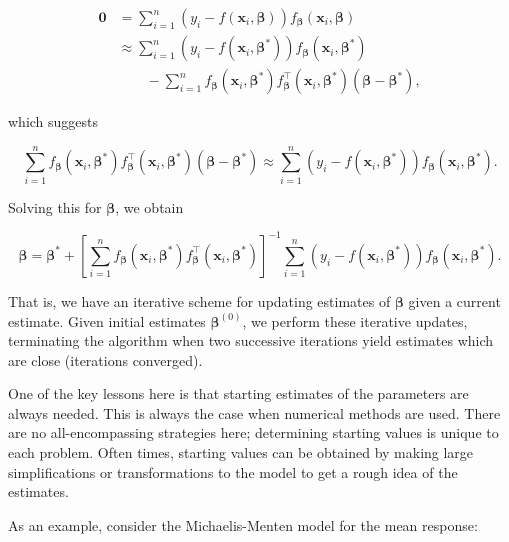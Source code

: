 \documentclass[
  letterpaper,
  DIV=11,
  numbers=noendperiod]{scrreprt}
\theoremstyle{definition}
\theoremstyle{definition}
\theoremstyle{remark}
\begin{document}
\[
\begin{aligned}
  \mathbf{0} &= \sum_{i=1}^{n} \left(y_i - f\left(\mathbf{x}_i, \boldsymbol{\beta}\right)\right) f_{\boldsymbol{\beta}}\left(\mathbf{x}_i, \boldsymbol{\beta}\right) \\
    &\approx \sum\limits_{i=1}^{n} \left(y_i - f(\mathbf{x}_i,\boldsymbol{\beta}^*)\right)f_{\boldsymbol{\beta}}(\mathbf{x}_i,\boldsymbol{\beta}^*) \\
    &\qquad - \sum\limits_{i=1}^{n} f_{\boldsymbol{\beta}}\left(\mathbf{x}_i,\boldsymbol{\beta}^*\right)f_{\boldsymbol{\beta}}^\top\left(\mathbf{x}_i,\boldsymbol{\beta}^*\right)\left(\boldsymbol{\beta}-\boldsymbol{\beta}^*\right),
\end{aligned}
\]

which suggests

\[\sum_{i=1}^{n} f_{\boldsymbol{\beta}}\left(\mathbf{x}_i,\boldsymbol{\beta}^*\right)f_{\boldsymbol{\beta}}^\top\left(\mathbf{x}_i,\boldsymbol{\beta}^*\right)\left(\boldsymbol{\beta}-\boldsymbol{\beta}^*\right) \approx \sum\limits_{i=1}^{n} \left(y_i - f(\mathbf{x}_i,\boldsymbol{\beta}^*)\right)f_{\boldsymbol{\beta}}(\mathbf{x}_i,\boldsymbol{\beta}^*).\]

Solving this for \(\boldsymbol{\beta}\), we obtain

\[\boldsymbol{\beta} = \boldsymbol{\beta}^* + \left[\sum_{i=1}^{n} f_{\boldsymbol{\beta}}\left(\mathbf{x}_i,\boldsymbol{\beta}^*\right)f_{\boldsymbol{\beta}}^\top\left(\mathbf{x}_i,\boldsymbol{\beta}^*\right)\right]^{-1}\sum\limits_{i=1}^{n} \left(y_i - f(\mathbf{x}_i,\boldsymbol{\beta}^*)\right)f_{\boldsymbol{\beta}}(\mathbf{x}_i,\boldsymbol{\beta}^*).\]

That is, we have an iterative scheme for updating estimates of
\(\boldsymbol{\beta}\) given a current estimate. Given initial estimates
\(\boldsymbol{\beta}^{(0)}\), we perform these iterative updates,
terminating the algorithm when two successive iterations yield estimates
which are close (iterations converged).

One of the key lessons here is that starting estimates of the parameters
are always needed. This is always the case when numerical methods are
used. There are no all-encompassing strategies here; determining
starting values is unique to each problem. Often times, starting values
can be obtained by making large simplifications or transformations to
the model to get a rough idea of the estimates.

As an example, consider the Michaelis-Menten model for the mean
response:
\end{document}
